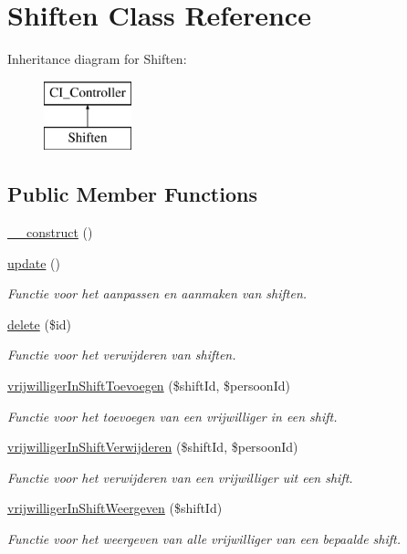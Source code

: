 \hypertarget{class_shiften}{}\section{Shiften Class Reference}
\label{class_shiften}
Inheritance diagram for Shiften\+:\begin{figure}[H]
\begin{center}
\leavevmode
\includegraphics[height=2.000000cm]{class_shiften}
\end{center}
\end{figure}
\subsection*{Public Member Functions}
\begin{DoxyCompactItemize}
\item 
\mbox{\hyperlink{class_shiften_a095c5d389db211932136b53f25f39685}{\+\_\+\+\_\+construct}} ()
\item 
\mbox{\hyperlink{class_shiften_a842e4774e3b3601a005b995c02f7e883}{update}} ()
\begin{DoxyCompactList}\small\item\em Functie voor het aanpassen en aanmaken van shiften. \end{DoxyCompactList}\item 
\mbox{\hyperlink{class_shiften_a2f8258add505482d7f00ea26493a5723}{delete}} (\$id)
\begin{DoxyCompactList}\small\item\em Functie voor het verwijderen van shiften. \end{DoxyCompactList}\item 
\mbox{\hyperlink{class_shiften_ab799250126ff159fd1ca9e896a57bcb6}{vrijwilliger\+In\+Shift\+Toevoegen}} (\$shift\+Id, \$persoon\+Id)
\begin{DoxyCompactList}\small\item\em Functie voor het toevoegen van een vrijwilliger in een shift. \end{DoxyCompactList}\item 
\mbox{\hyperlink{class_shiften_acd0ea5b1f1b5ef6ee363916d98a261cb}{vrijwilliger\+In\+Shift\+Verwijderen}} (\$shift\+Id, \$persoon\+Id)
\begin{DoxyCompactList}\small\item\em Functie voor het verwijderen van een vrijwilliger uit een shift. \end{DoxyCompactList}\item 
\mbox{\hyperlink{class_shiften_acc7f0b07717791306d83399416669ef9}{vrijwilliger\+In\+Shift\+Weergeven}} (\$shift\+Id)
\begin{DoxyCompactList}\small\item\em Functie voor het weergeven van alle vrijwilliger van een bepaalde shift. \end{DoxyCompactList}\end{DoxyCompactItemize}


